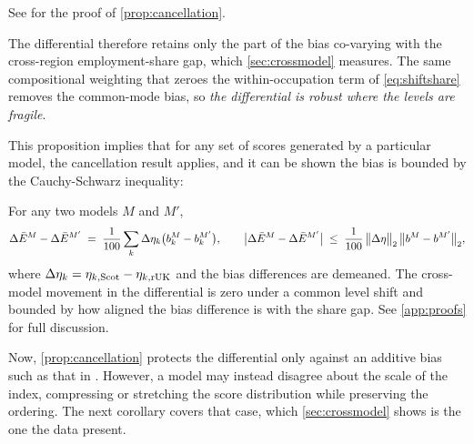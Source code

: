 \noindent
See  for the proof of \cref{prop:cancellation}.

The differential therefore retains only the part of the bias co-varying with the cross-region employment-share gap, which \cref{sec:crossmodel} measures. The same compositional weighting that zeroes the within-occupation term of \cref{eq:shiftshare} removes the common-mode bias, so \textit{the differential is robust where the levels are fragile}. 

This proposition implies that for any set of scores generated by a particular model, the cancellation result applies, and it can be shown the bias is bounded by the Cauchy-Schwarz inequality:

\begin{corollary}\label{cor:crossmodel}
For any two models $M$ and $M'$,
\begin{equation}\label{eq:cor1}
\Delta\bar{E}^{M} - \Delta\bar{E}^{M'} \;=\;
\frac{1}{100} \sum_k \Delta\eta_k
\bigl(b^{M}_k - b^{M'}_k\bigr),
\qquad
\bigl|\Delta\bar{E}^{M} - \Delta\bar{E}^{M'}\bigr| \;\le\;
\frac{1}{100}\,\bigl\lVert \Delta\eta \bigr\rVert_2\,
\bigl\lVert b^{M} - b^{M'} \bigr\rVert_2 ,
\end{equation}
where $\Delta\eta_k = \eta_{k,\mathrm{Scot}} - \eta_{k,\mathrm{rUK}}$ and the bias differences are demeaned. The cross-model movement in the differential is zero under a common level shift and bounded by how aligned the bias difference is with the share gap. See \cref{app:proofs} for full discussion.
\end{corollary}

\noindent
Now, \cref{prop:cancellation} protects the differential only against an additive bias such as that in . However, a model may instead disagree about the scale of the index, compressing or stretching the score distribution while preserving the ordering. The next corollary covers that case, which \cref{sec:crossmodel} shows is the one the data present.

